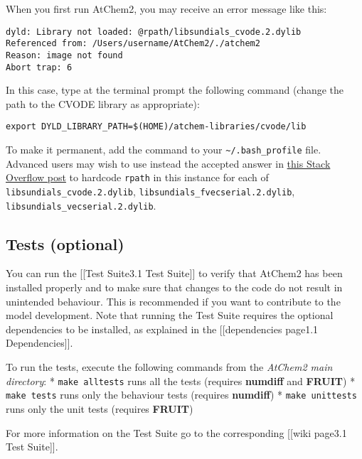 When you first run AtChem2, you may receive an error message like this:

\begin{verbatim}
dyld: Library not loaded: @rpath/libsundials_cvode.2.dylib
Referenced from: /Users/username/AtChem2/./atchem2
Reason: image not found
Abort trap: 6
\end{verbatim}

In this case, type at the terminal prompt the following command (change
the path to the CVODE library as appropriate):

\begin{verbatim}
export DYLD_LIBRARY_PATH=$(HOME)/atchem-libraries/cvode/lib
\end{verbatim}

To make it permanent, add the command to your
\texttt{\textasciitilde{}/.bash\_profile} file. Advanced users may wish
to use instead the accepted answer in
\href{https://stackoverflow.com/questions/17703510/dyld-library-not-loaded-reason-image-not-loaded}{this
Stack Overflow post} to hardcode \texttt{rpath} in this instance for
each of \texttt{libsundials\_cvode.2.dylib},
\texttt{libsundials\_fvecserial.2.dylib},
\texttt{libsundials\_vecserial.2.dylib}.

\hypertarget{tests-optional}{%
\subsection{Tests (optional)}\label{tests-optional}}

You can run the {[}{[}Test Suite\textbar{}3.1 Test Suite{]}{]} to verify
that AtChem2 has been installed properly and to make sure that changes
to the code do not result in unintended behaviour. This is recommended
if you want to contribute to the model development. Note that running
the Test Suite requires the optional dependencies to be installed, as
explained in the {[}{[}dependencies page\textbar{}1.1
Dependencies{]}{]}.

To run the tests, execute the following commands from the \emph{AtChem2
main directory}: * \texttt{make\ alltests} runs all the tests (requires
\textbf{numdiff} and \textbf{FRUIT}) * \texttt{make\ tests} runs only
the behaviour tests (requires \textbf{numdiff}) *
\texttt{make\ unittests} runs only the unit tests (requires
\textbf{FRUIT})

For more information on the Test Suite go to the corresponding
{[}{[}wiki page\textbar{}3.1 Test Suite{]}{]}.
